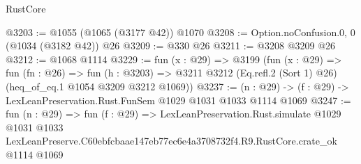 \begin{lexlean}{RustCore}
\begin{coremodule}
@3203 := @1055 (@1065 (@3177 @42)) @1070
@3208 := Option.noConfusion.{0, 0} (@1034 (@3182 @42)) @26
@3209 := @330 @26
@3211 := @3208 @3209 @26
@3212 := @1068 @1114
@3229 := fun (x : @29) =>
  @3199
    (fun (x : @29) =>
    fun (fn : @26) =>
    fun (h : @3203) =>
    @3211 @3212 (Eq.refl.{2} (Sort 1) @26) (heq_of_eq.{1} @1054 @3209 @3212 @1069))
@3237 := (n : @29) -> (f : @29) -> LexLeanPreservation.Rust.FunSem @1029 @1031 @1033 @1114 @1069
@3247 := fun (n : @29) =>
  fun (f : @29) =>
  LexLeanPreservation.Rust.simulate
    @1029
    @1031
    @1033
    LexLeanPreserve.C60ebfcbaae147eb77ec6e4a3708732f4.R9.RustCore.crate_ok
    @1114
    @1069
\end{coremodule}
\end{lexlean}
